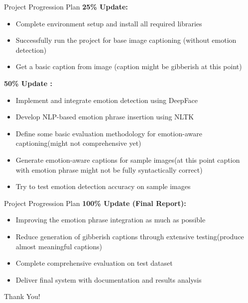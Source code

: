 \documentclass{beamer}
\begin{document}
\begin{frame}{Project Progression Plan}
    \textbf{25\% Update:}
    \begin{itemize}
        \item Complete environment setup and install all required libraries
        \item Successfully run the project for base image captioning (without emotion detection)
        \item Get a basic caption from image (caption might be gibberish at this point)
    \end{itemize}
    
    \vspace{0.4cm}
    
    \textbf{50\% Update :}
    \begin{itemize}
        \item Implement and integrate emotion detection using DeepFace
        \item Develop NLP-based emotion phrase insertion using NLTK
        \item Define some basic evaluation methodology for emotion-aware captioning(might not comprehensive yet)
        \item Generate emotion-aware captions for sample images(at this point caption with emotion phrase might not be fully syntactically correct)
        \item Try to test  emotion detection accuracy on sample images
    \end{itemize}
    
    \vspace{0.4cm}
\end{frame}
\begin{frame}{Project Progression Plan}    
    \textbf{100\% Update (Final Report):}
    \begin{itemize}
        \item Improving the emotion phrase integration as much as possible
        \item Reduce generation of gibberish captions through extensive testing(produce almost meaningful captions)
        \item Complete comprehensive evaluation on test dataset
        \item Deliver final system with documentation and results analysis
    \end{itemize}
\end{frame}
\begin{frame}
    \centering
    \Huge Thank You!\\
\end{frame}
\end{document}
